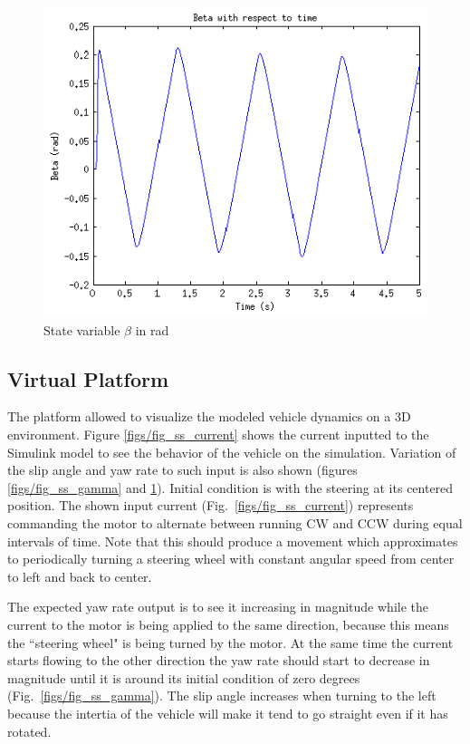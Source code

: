 \documentclass[twocolumn,10pt]{asme2e}
\begin{document}
\begin{figure}
\begin{center}
\includegraphics{figs/fig_ss_beta.eps}
\caption{State variable $\beta$ in rad}
\label{figs/fig_ss_beta}
\end{center}
\end{figure}

\subsection*{Virtual Platform}
The platform allowed to visualize the modeled vehicle dynamics on a 3D environment. Figure \ref{figs/fig_ss_current} shows the current inputted to the Simulink model to see the behavior of the vehicle on the simulation. Variation of the slip angle and yaw rate to such input is also shown (figures \ref{figs/fig_ss_gamma} and \ref{figs/fig_ss_beta}). Initial condition is with the steering at its centered position. The shown input current (Fig.~\ref{figs/fig_ss_current}) represents commanding the motor to alternate between running CW and CCW during equal intervals of time. Note that this should produce a movement which approximates to periodically turning a steering wheel with constant angular speed from center to left and back to center.

The expected yaw rate output is to see it increasing in magnitude while the current to the motor is being applied to the same direction, because this means the ``steering wheel" is being turned by the motor. At the same time the current starts flowing to the other direction the yaw rate should start to decrease in magnitude until it is around its initial condition of zero degrees (Fig.~\ref{figs/fig_ss_gamma}). The slip angle increases when turning to the left because the intertia of the vehicle will make it tend to go straight even if it has rotated.
\end{document}
